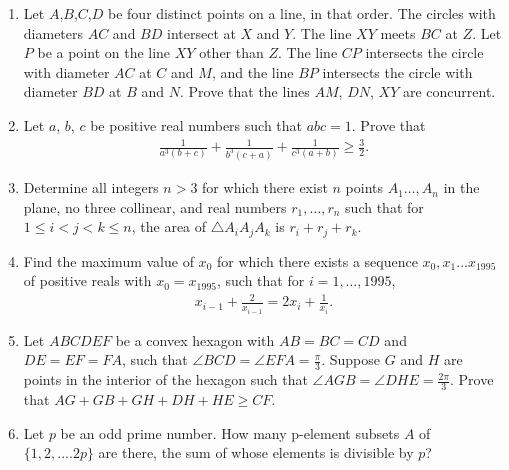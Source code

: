 \documentclass{article}
\begin{document}
\begin{enumerate}
\item Let $A$,$B$,$C$,$D$ be four distinct points on a line, in that order. The circles with diameters $AC$ and $BD$ intersect at $X$ and $Y$. The line $XY$ meets $BC$ at $Z$. Let $P$ be a point on the line $XY$ other than $Z$. The line $CP$ intersects the circle with diameter $AC$ at $C$ and $M$, and the line $BP$ intersects the circle with diameter $BD$ at $B$ and $N$. Prove that the lines $AM$, $DN$, $XY$ are concurrent.
\item Let $a$, $b$, $c$ be positive real numbers such that $abc=1$. Prove that
\begin{align}	
\frac{1}{a^3(b+c)}+\frac{1}{b^3(c+a)}+\frac{1}{c^3(a+b)}\geq\frac{3}{2}.
\end{align}
\item Determine all integers $n>3$ for which there exist $n$ points $A_1\dots,A_n$ in the plane, no three collinear, and real numbers $r_1,\dots,r_n$ such that for $1\leq{i}<{j}<{k}\leq{n}$, the area of $\triangle A_iA_jA_k$ is $r_i+r_j+r_k$.
\item Find the maximum value of $x_{0}$ for which there exists a sequence $x_{0},x_{1}\dots x_{1995}$ of positive reals with $x_{0}=x_{1995}$, such that for $i=1,\dots,1995$,
\begin{align}
x_{i-1}+\frac{2}{x_{i-1}}=2x_i+\frac{1}{x_i}. 
\end{align}
\item Let $ABCDEF$ be a convex hexagon with $AB=BC=CD$ and $DE=EF=FA$, such that $\angle{BCD}=\angle{EFA}=\frac{\pi}{3}$. Suppose $G$ and $H$ are points in the interior of the hexagon such that $\angle{AGB}=\angle{DHE}=\frac{2\pi}{3}$. Prove that $AG+GB+GH+DH+HE\geq CF$.
\item Let $p$ be an odd prime number. How many p-element subsets $A$ of $\{1,2,....2p\}$ are there, the sum of whose elements is divisible by $p$? 
\end{enumerate}
\end{document}
